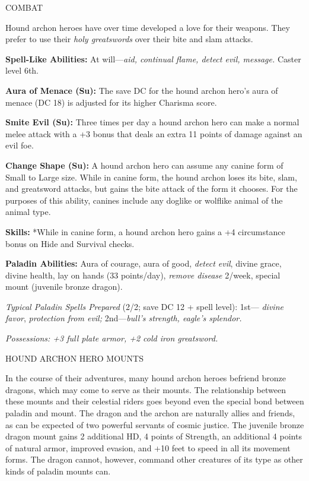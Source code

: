 \documentclass{article}
\begin{document}
COMBAT

Hound archon heroes have over time developed a love for their weapons. They prefer 
to use their \textit{holy greatswords }over their bite and slam attacks.

\textbf{Spell-Like Abilities:} At will---\textit{aid, continual flame, detect evil, 
message. }Caster level 6th.

\textbf{Aura of Menace (Su):} The save DC for the hound archon hero's aura of menace 
(DC 18) is adjusted for its higher Charisma score.

\textbf{Smite Evil (Su):} Three times per day a hound archon hero can make a normal 
melee attack with a +3 bonus that deals an extra 11 points of damage against an 
evil foe.

\textbf{Change Shape (Su):} A hound archon hero can assume any canine form of Small 
to Large size. While in canine form, the hound archon loses its bite, slam, and 
greatsword attacks, but gains the bite attack of the form it chooses. For the purposes 
of this ability, canines include any doglike or wolflike animal of the animal type.

\textbf{Skills:} *While in canine form, a hound archon hero gains a +4 circumstance 
bonus on Hide and Survival checks.

\textbf{Paladin Abilities: }Aura of courage, aura of good, \textit{detect evil}, 
divine grace, divine health, lay on hands (33 points/day), \textit{remove disease 
}2/week, special mount (juvenile bronze dragon). 

\textit{Typical Paladin Spells Prepared }(2/2; save DC 12 + spell level): 1st--- 
\textit{divine favor}, \textit{protection from evil; }2nd---\textit{bull's strength, 
eagle's splendor.}

\textit{Possessions: +3 full plate armor, +2 cold iron greatsword.}

\vspace{12pt}
HOUND ARCHON HERO MOUNTS

In the course of their adventures, many hound archon heroes befriend bronze dragons, 
which may come to serve as their mounts. The relationship between these mounts 
and their celestial riders goes beyond even the special bond between paladin and 
mount. The dragon and the archon are naturally allies and friends, as can be expected 
of two powerful servants of cosmic justice. The juvenile bronze dragon mount gains 
2 additional HD, 4 points of Strength, an additional 4 points of natural armor, 
improved evasion, and +10 feet to speed in all its movement forms. The dragon cannot, 
however, command other creatures of its type as other kinds of paladin mounts can.
\end{document}
